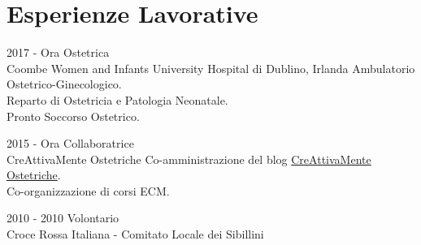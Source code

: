 \documentclass[11pt]{friggeri-cv}
\begin{document}
\section{Esperienze Lavorative}
\begin{entrylist}
    \entry
  {2017 - Ora}
  {Ostetrica}
  {\\Coombe Women and Infants University Hospital di Dublino, Irlanda}
  {Ambulatorio Ostetrico-Ginecologico.\\
    Reparto di Ostetricia e Patologia Neonatale.\\
    Pronto Soccorso Ostetrico.}
  
  \entry
  {2015 - Ora}
  {Collaboratrice}
  {\\CreAttivaMente Ostetriche}
  {Co-amministrazione del blog 
  \href{http://creattivamenteostetriche2012.blogspot.it/}{CreAttivaMente 
  Ostetriche}. \\
  Co-organizzazione di corsi ECM.}
  
  \entry
  {2010 - 2010}
  {Volontario}
  {\\Croce Rossa Italiana - Comitato Locale dei Sibillini}
  {}
\end{entrylist}
\vspace{-20pt}
\end{document}
